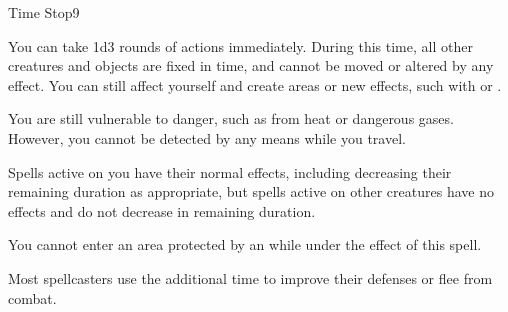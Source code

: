\begin{spellsection}{Time Stop}{9}
    \begin{spellheader}
    \end{spellheader}
    \begin{spellcontent}
        \begin{spelltargetinginfo}
        \end{spelltargetinginfo}
        \begin{spelleffects}
            \spelleffect You can take 1d3 rounds of actions immediately. During this time, all other creatures and objects are fixed in time, and cannot be moved or altered by any effect. You can still affect yourself and create areas or new effects, such with  or .

            You are still vulnerable to danger, such as from heat or dangerous gases. However, you cannot be detected by any means while you travel.
        \end{spelleffects}
    \end{spellcontent}
    \begin{spellfooter}
        \spellnotes Spells active on you have their normal effects, including decreasing their remaining duration as appropriate, but spells active on other creatures have no effects and do not decrease in remaining duration.

        You cannot enter an area protected by an  while under the effect of this spell.

        Most spellcasters use the additional time to improve their defenses or flee from combat. 
        \miscastexplode
    \end{spellfooter}
\end{spellsection}

